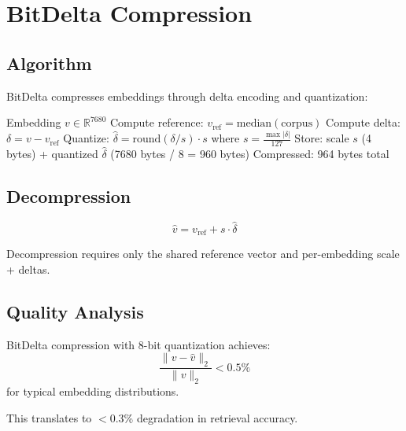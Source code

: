 \section{BitDelta Compression}

\label{sec:compression}

\subsection{Algorithm}

BitDelta compresses embeddings through delta encoding and quantization:

\begin{algorithm}
\caption{BitDelta Compression}
\label{alg:bitdelta}
\begin{algorithmic}[1]
\REQUIRE Embedding $v \in \mathbb{R}^{7680}$
\STATE Compute reference: $v_{\text{ref}} = \text{median}(\text{corpus})$
\STATE Compute delta: $\delta = v - v_{\text{ref}}$
\STATE Quantize: $\hat{\delta} = \text{round}(\delta / s) \cdot s$ where $s = \frac{\max|\delta|}{127}$
\STATE Store: scale $s$ (4 bytes) + quantized $\hat{\delta}$ (7680 bytes / 8 = 960 bytes)
\RETURN Compressed: 964 bytes total
\end{algorithmic}
\end{algorithm}

\subsection{Decompression}

\begin{equation}
\hat{v} = v_{\text{ref}} + s \cdot \hat{\delta}
\end{equation}

Decompression requires only the shared reference vector and per-embedding scale + deltas.

\subsection{Quality Analysis}

\begin{proposition}
BitDelta compression with 8-bit quantization achieves:
\begin{equation}
\frac{\|v - \hat{v}\|_2}{\|v\|_2} < 0.5\%
\end{equation}
for typical embedding distributions.
\end{proposition}

This translates to $<$0.3\% degradation in retrieval accuracy.

